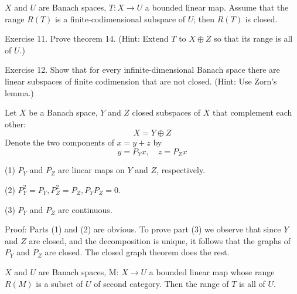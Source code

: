 \documentclass[12pt, oneside]{book}
\begin{document}
\begin{theorem}
    $X$ and $U$ are Banach spaces, $T: X \rightarrow U$ a bounded linear map. Assume that the range $R\left(T\right)$ is a finite-codimensional subspace of $U$; then $R\left(T\right)$ is closed.

    Exercise 11. Prove theorem 14. (Hint: Extend $T$ to $X \oplus Z$ so that its range is all of $U$.)

    Exercise 12. Show that for every infinite-dimensional Banach space there are linear subspaces of finite codimension that are not closed. (Hint: Use Zorn's lemma.)
\end{theorem}

\begin{theorem}
    Let  $X$ be a Banach space, $Y$ and $Z$ closed subspaces of $X$ that complement each other:
    \begin{equation*}
        X=Y \oplus Z
    \end{equation*}
    Denote the two components of $x=y+z$ by
    \begin{equation*}
        y= {P}_Y x, \quad z= {P}_Z x
    \end{equation*}

    (1) $ {P}_Y$ and $ {P}_Z$ are linear maps    on $Y$ and $Z$, respectively.

    (2) $ {P}_Y^2= {P}_Y,  {P}
        _Z^2= {P}_Z,  {P}_Y  {P}_Z=0$.

    (3) $ {P}_Y$ and $ {P}_Z$ are continuous.

    Proof:
    Parts (1) and (2) are obvious. To prove part (3) we observe that since $Y$ and $Z$ are closed, and the decomposition is unique, it follows that the graphs of $ {P}_Y$ and $ {P}_Z$ are closed. The closed graph theorem does the rest.
\end{theorem}


\begin{theorem}
    $X$ and $U$ are Banach spaces, M: $X \rightarrow U$ a bounded linear map whose range $R(M)$ is a subset of $U$ of second category. Then the range of $T$ is all of $U$.
\end{theorem}
\end{document}
